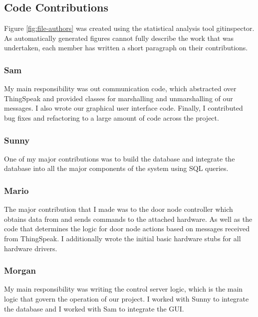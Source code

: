 
\subsection{Code Contributions}

Figure \ref{fig:file-authors} was created using the statistical analysis tool
gitinspector. As automatically generated figures cannot fully describe the work
that was undertaken, each member has written a short paragraph on their
contributions.

\subsubsection{Sam}
My main responsibility was out communication code, which abstracted over
ThingSpeak and provided classes for marshalling and unmarshalling of our
messages. I also wrote our graphical user interface code. Finally, I
contributed bug fixes and refactoring to a large amount of code across the
project.

\subsubsection{Sunny}
One of my major contributions was to build the
database and integrate the database into all
the major components of the system using SQL queries.
\subsubsection{Mario}

The major contribution that I made was to the door node controller which
obtains data from and sends commands to the attached hardware.
As well as the code that determines the logic for door node actions based
on messages received from ThingSpeak. I additionally wrote the initial
basic hardware stubs for all hardware drivers.
\subsubsection{Morgan}
My main responsibility was writing the control server logic, which is the main
logic that govern the operation of our project. I worked with Sunny to
integrate the database and I worked with Sam to integrate the GUI.



